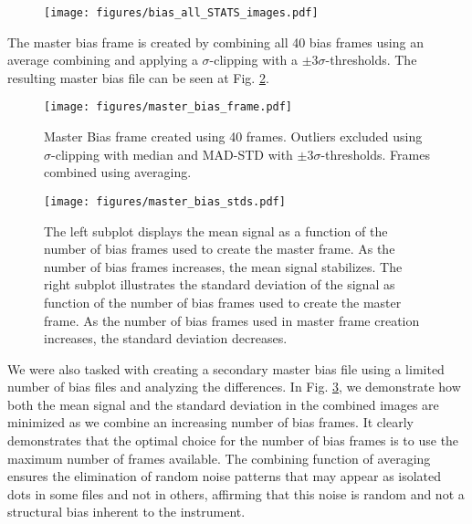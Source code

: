 \documentclass[twocolumn]{aastex631}
\begin{document}
\begin{figure}[ht!]
    \begin{centering}
        \texttt{[image: figures/bias\_all\_STATS\_images.pdf]}
        \caption{}
        \label{fig:bias_STATS}
    \end{centering}
\end{figure}

The master bias frame is created by combining all 40 bias frames using an average combining and applying a $\sigma$-clipping with a $\pm3\sigma$-thresholds. The resulting master bias file can be seen at Fig. \ref{fig:master_bias}.

\begin{figure}[ht!]
    \begin{centering}
        \texttt{[image: figures/master\_bias\_frame.pdf]}
        \caption{
            Master Bias frame created using 40 frames. Outliers excluded using $\sigma$-clipping with median and MAD-STD with $\pm3\sigma$-thresholds. Frames combined using averaging.
        }
        \label{fig:master_bias}
    \end{centering}
\end{figure}


\begin{figure}[ht!]
    \begin{centering}
        \texttt{[image: figures/master\_bias\_stds.pdf]}
        \caption{The left subplot  displays the mean signal as a function of the number of bias frames used to create the master frame. As the number of bias frames increases, the mean signal stabilizes. 
        The right subplot illustrates the standard deviation of the signal as function of the number of bias frames used to create the master frame. As the number of bias frames used in master frame creation increases, the standard deviation decreases.}
        \label{fig:bias_frame_stats}
    \end{centering}
\end{figure}
We were also tasked with creating a secondary master bias file using a limited number of bias files and analyzing the differences. In Fig. \ref{fig:bias_frame_stats}, we demonstrate how both the mean signal and the standard deviation in the combined images are minimized as we combine an increasing number of bias frames. It clearly demonstrates that the optimal choice for the number of bias frames is to use the maximum number of frames available. The combining function of averaging ensures the elimination of random noise patterns that may appear as isolated dots in some files and not in others, affirming that this noise is random and not a structural bias inherent to the instrument.
\end{document}
